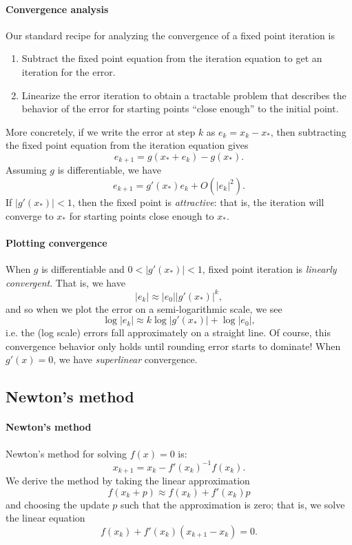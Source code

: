 \documentclass[12pt, leqno]{article}
\begin{document}
\paragraph{Convergence analysis}
Our standard recipe for analyzing the convergence of a fixed point
iteration is
\begin{enumerate}
\item Subtract the fixed point equation from the iteration equation
  to get an iteration for the error.
\item Linearize the error iteration to obtain a tractable problem
  that describes the behavior of the error for starting points
  ``close enough'' to the initial point.
\end{enumerate}
More concretely, if we write the error at step $k$ as $e_k = x_k-x_*$,
then subtracting the fixed point equation from the iteration equation
gives
\[
  e_{k+1} = g(x_* + e_k) - g(x_*).
\]
Assuming $g$ is differentiable, we have
\[
  e_{k+1} = g'(x_*) e_k + O(|e_k|^2).
\]
If $|g'(x_*)| < 1$, then the fixed point is {\em attractive}: 
that is, the iteration will converge to $x_*$ for starting points
close enough to $x_*$.

\paragraph{Plotting convergence}
When $g$ is differentiable and $0 < |g'(x_*)| < 1$, fixed point
iteration is {\em linearly convergent}.  That is, we have
\[
  |e_k| \approx |e_0| |g'(x_*)|^k,
\]
and so when we plot the error on a semi-logarithmic scale, we see
\[
  \log |e_k| \approx k \log |g'(x_*)| + \log |e_0|,
\]
i.e. the (log scale) errors fall approximately on a straight line.
Of course, this convergence behavior only holds until rounding error
starts to dominate!  When $g'(x) = 0$, we have {\em superlinear}
convergence.

\subsection{Newton's method}

\paragraph{Newton's method}
Newton's method for solving $f(x) = 0$ is:
\[
  x_{k+1} = x_k - f'(x_k)^{-1} f(x_k).
\]
We derive the method by taking the linear approximation
\[
  f(x_k + p) \approx f(x_k) + f'(x_k) p
\]
and choosing the update $p$ such that the approximation is zero;
that is, we solve the linear equation
\[
  f(x_k) + f'(x_k) (x_{k+1}-x_k) = 0.
  \]
\end{document}
